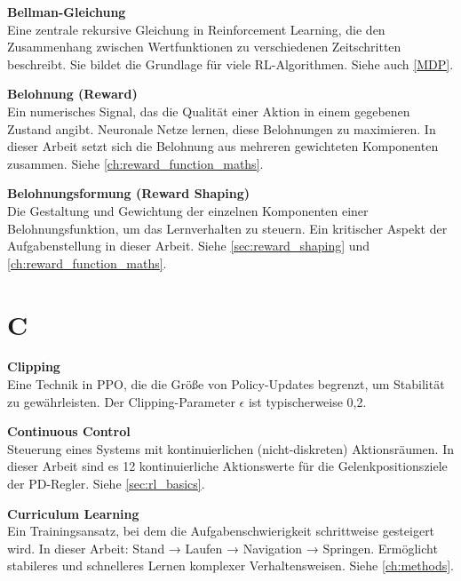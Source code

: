 \vspace{0.5cm}
\noindent\textbf{Bellman-Gleichung} \\
Eine zentrale rekursive Gleichung in Reinforcement Learning, die den Zusammenhang zwischen Wertfunktionen zu verschiedenen Zeitschritten beschreibt. Sie bildet die Grundlage für viele RL-Algorithmen. Siehe auch \autoref{MDP}.

\vspace{0.5cm}
\noindent\textbf{Belohnung (Reward)} \\
Ein numerisches Signal, das die Qualität einer Aktion in einem gegebenen Zustand angibt. Neuronale Netze lernen, diese Belohnungen zu maximieren. In dieser Arbeit setzt sich die Belohnung aus mehreren gewichteten Komponenten zusammen. Siehe \autoref{ch:reward_function_maths}.

\vspace{0.5cm}
\noindent\textbf{Belohnungsformung (Reward Shaping)} \\
Die Gestaltung und Gewichtung der einzelnen Komponenten einer Belohnungsfunktion, um das Lernverhalten zu steuern. Ein kritischer Aspekt der Aufgabenstellung in dieser Arbeit. Siehe \autoref{sec:reward_shaping} und \autoref{ch:reward_function_maths}.

\section*{C}

\vspace{0.3cm}
\noindent\textbf{Clipping} \\
Eine Technik in PPO, die die Größe von Policy-Updates begrenzt, um Stabilität zu gewährleisten. Der Clipping-Parameter $\epsilon$ ist typischerweise 0,2.

\vspace{0.5cm}
\noindent\textbf{Continuous Control} \\
Steuerung eines Systems mit kontinuierlichen (nicht-diskreten) Aktionsräumen. In dieser Arbeit sind es 12 kontinuierliche Aktionswerte für die Gelenkpositionsziele der PD-Regler. Siehe \autoref{sec:rl_basics}.

\vspace{0.5cm}
\noindent\textbf{Curriculum Learning} \\
Ein Trainingsansatz, bei dem die Aufgabenschwierigkeit schrittweise gesteigert wird. In dieser Arbeit: Stand → Laufen → Navigation → Springen. Ermöglicht stabileres und schnelleres Lernen komplexer Verhaltensweisen. Siehe \autoref{ch:methods}.

